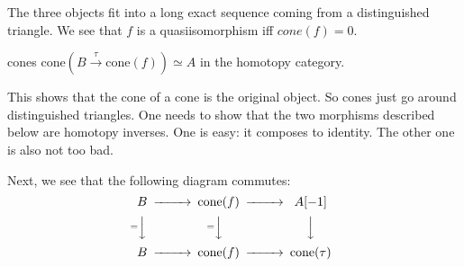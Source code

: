 The three objects fit into a long exact sequence coming from a distinguished triangle. We see that $f$ is a quasiisomorphism iff $cone(f)=0$. 

\begin{proposition}{}{cones}
    $\mathrm{cone}(B\xrightarrow{\tau} \mathrm{cone}(f))\simeq A$ in the homotopy category.
\end{proposition}

This shows that the cone of a cone is the original object. So cones just go around distinguished triangles. One needs to show that the two morphisms described below are homotopy inverses. One is easy: it composes to identity. The other one is also not too bad.


Next, we see that the following diagram commutes:$$\begin{CD} B @> > > \mathrm{cone}(f)@> > > A[-1] \\ @V=VV @V=VV @VVV\\B @> > > \mathrm{cone}(f) @> > > \mathrm{cone(\tau)}\end{CD}$$

